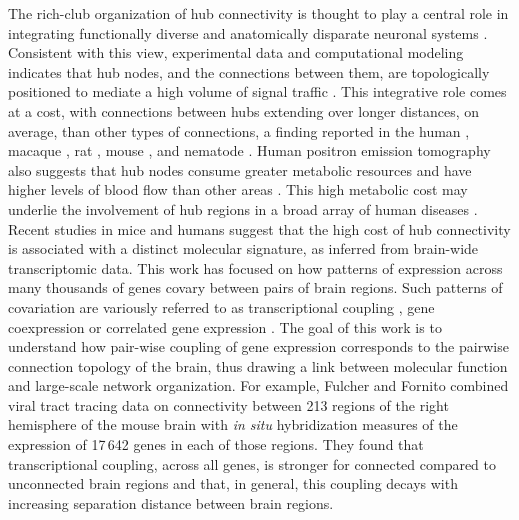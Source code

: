 \documentclass[10pt,letterpaper]{article}
\begin{document}
The rich-club organization of hub connectivity is thought to play a central role in integrating functionally diverse and anatomically disparate neuronal systems \cite{Fornito2015, vandenHeuvel:2013ij, ZamoraLopez:2010hy, Crossley2014, Crossley:2013kl}.
Consistent with this view, experimental data and computational modeling indicates that hub nodes, and the connections between them, are topologically positioned to mediate a high volume of signal traffic \cite{vandenHeuvel:2012kh, Harriger2012, Misic:2014it, Misic:2015jw}.
This integrative role comes at a cost, with connections between hubs extending over longer distances, on average, than other types of connections, a finding reported in the human \cite{vandenHeuvel:2012kh}, macaque \cite{Harriger2012}, rat \cite{VandenHeuvel2016b}, mouse \cite{Fulcher:2016ck}, and nematode \cite{Towlson2013}.
Human positron emission tomography also suggests that hub nodes consume greater metabolic resources and have higher levels of blood flow than other areas \cite{Tomasi:2013kl, Collin:2014kq, Liang2013a}.
This high metabolic cost may underlie the involvement of hub regions in a broad array of human diseases \cite{Fornito2015, Bullmore:2012vl, Crossley2014}. \\ %
Recent studies in mice and humans suggest that the high cost of hub connectivity is associated with a distinct molecular signature, as inferred from brain-wide transcriptomic data. 
This work has focused on how patterns of expression across many thousands of genes covary between pairs of brain regions. 
Such patterns of covariation are variously referred to as transcriptional coupling \cite{Fulcher2016}, gene coexpression \cite{Krienen2016} or correlated gene expression \cite{Richiardi2015, Mills2017, Goel2014}. 
The goal of this work is to understand how pair-wise coupling of gene expression corresponds to the pairwise connection topology of the brain, thus drawing a link between molecular function and large-scale network organization. 
For example, Fulcher and Fornito \cite{Fulcher:2016ck} combined viral tract tracing data on connectivity between 213 regions of the right hemisphere of the mouse brain \cite{Oh2014} with \emph{in situ} hybridization measures of the expression of 17\,642 genes in each of those regions.
They found that transcriptional coupling, across all genes, is stronger for connected compared to unconnected brain regions and that, in general, this coupling decays with increasing separation distance between brain regions.
\end{document}

